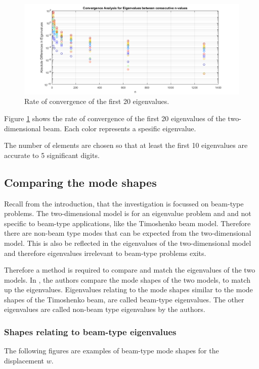 \documentclass[../../main.tex]{subfiles}
\begin{document}
\begin{figure}[H]
    \centering
    \begin{adjustbox}{center}
        \includegraphics[scale=0.7]{Convergence.png}
    \end{adjustbox}
    \caption{Rate of convergence of the first 20 eigenvalues.}
    \label{fig:conv_2d_eig}
\end{figure}


Figure \ref{fig:conv_2d_eig} shows the rate of convergence of the first 20 eigenvalues of the two-dimensional beam. Each color represents a spesific eigenvalue.

The number of elements are chosen so that at least the first 10 eigenvalues are accurate to 5 significant digits.

\subsection{Comparing the mode shapes}
Recall from the introduction, that the investigation is focussed on beam-type problems. The two-dimensional model is for an eigenvalue problem and and not specific to beam-type applications, like the Timoshenko beam model. Therefore there are non-beam type modes that can be expected from the two-dimensional model. This is also be reflected in the eigenvalues of the two-dimensional model and therefore eigenvalues irrelevant to beam-type problems exits.

Therefore a method is required to compare and match the eigenvalues of the two models. In \cite{LVV09}, the authors compare the mode shapes of the two models, to match up the eigenvalues. Eigenvalues relating to the mode shapes similar to the mode shapes of the Timoshenko beam, are called beam-type eigenvalues. The other eigenvalues are called non-beam type eigenvalues by the authors.

\subsubsection{Shapes relating to beam-type eigenvalues}
The following figures are examples of beam-type mode shapes for the displacement $w$.
\end{document}
